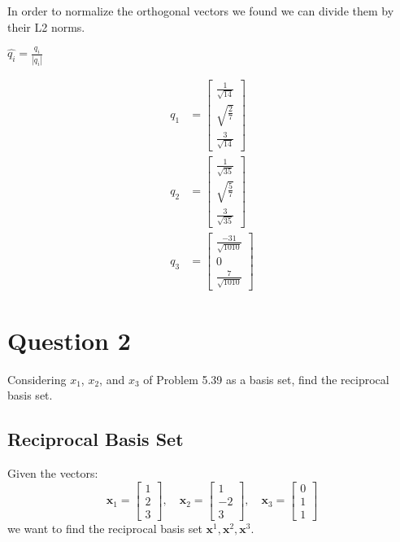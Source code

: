 \documentclass{article}
\begin{document}
In order to normalize the orthogonal vectors we found we can divide them by their L2 norms.

$\hat{q_i} = \frac{q_i}{|q_i|}$

\begin{align}
    q_1 &= \begin{bmatrix} \frac{1}{\sqrt{14}} \\ \sqrt{\frac{2}{7}} \\ \frac{3}{\sqrt{14}} \end{bmatrix}\\
    q_2 &= \begin{bmatrix} \frac{1}{\sqrt{35}} \\ \sqrt{\frac{5}{7}} \\ \frac{3}{\sqrt{35}} \end{bmatrix} \\
    q_3 &= \begin{bmatrix} \frac{-31}{\sqrt{1010}} \\ 0 \\ \frac{7}{\sqrt{1010}} \end{bmatrix}
\end{align}

\section{Question 2}

Considering $x_1$, $x_2$, and $x_3$ of Problem 5.39 as a basis set, find the reciprocal basis set.

\subsection{Reciprocal Basis Set}

Given the vectors:
\[
\mathbf{x}_1 = \begin{bmatrix} 1 \\ 2 \\ 3 \end{bmatrix}, \quad
\mathbf{x}_2 = \begin{bmatrix} 1 \\ -2 \\ 3 \end{bmatrix}, \quad
\mathbf{x}_3 = \begin{bmatrix} 0 \\ 1 \\ 1 \end{bmatrix}
\]
we want to find the reciprocal basis set \( \mathbf{x}^1, \mathbf{x}^2, \mathbf{x}^3 \).
\end{document}
